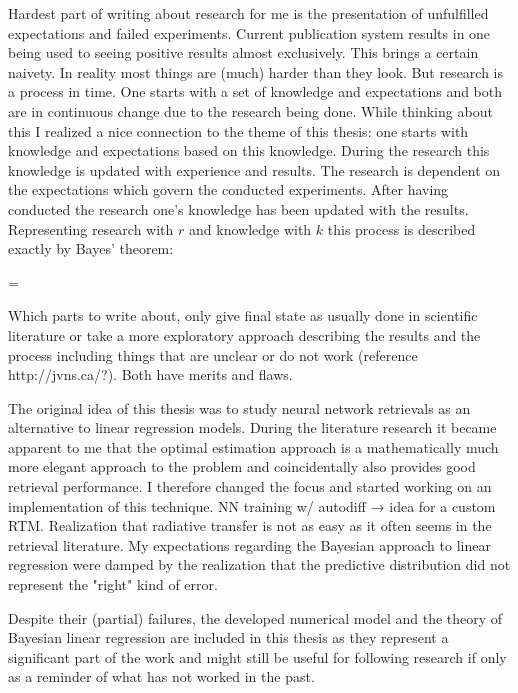 Hardest part of writing about research for me is the presentation of
unfulfilled expectations and failed experiments. Current publication system
results in one being used to seeing positive results almost exclusively. This
brings a certain naivety. In reality most things are (much) harder than they
look. But research is a process in time. One starts with a set of knowledge and
expectations and both are in continuous change due to the research being done.
While thinking about this I realized a nice connection to the theme of this
thesis: one starts with knowledge and expectations based on this knowledge.
During the research this knowledge is updated with experience and results. The
research is dependent on the expectations which govern the conducted
experiments.  After having conducted the research one's knowledge has been
updated with the results.  Representing research with $r$ and knowledge with
$k$ this process is described exactly by Bayes' theorem:

\startformula
     = 
\stopformula

Which parts to write about, only give final state as usually done in scientific
literature or take a more exploratory approach describing the results and the
process including things that are unclear or do not work (reference
http://jvns.ca/?). Both have merits and flaws.

The original idea of this thesis was to study neural network retrievals as an
alternative to linear regression models. During the literature research it
became apparent to me that the optimal estimation approach is a mathematically
much more elegant approach to the problem and coincidentally also provides
good retrieval performance. I therefore changed the focus and started working
on an implementation of this technique. NN training w/ autodiff → idea for a
custom RTM. Realization that radiative transfer is not as easy as it often
seems in the retrieval literature. My expectations regarding the Bayesian
approach to linear regression were damped by the realization that the
predictive distribution did not represent the "right" kind of error.

Despite their (partial) failures, the developed numerical model and the theory
of Bayesian linear regression are included in this thesis as they represent
a significant part of the work and might still be useful for following research
if only as a reminder of what has not worked in the past.


